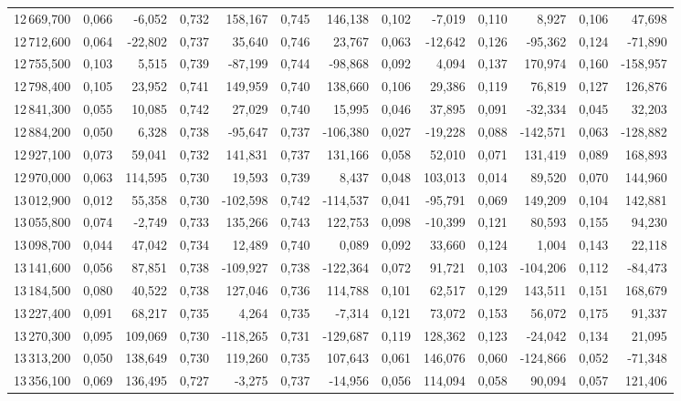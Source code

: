 \begin{longtable}{rrrrrrrrrrrrr}
12\,669,700 & 0,066 & -6,052 & 0,732 & 158,167 & 0,745 & 146,138 & 0,102 & -7,019 & 0,110 & 8,927 & 0,106 & 47,698\\
12\,712,600 & 0,064 & -22,802 & 0,737 & 35,640 & 0,746 & 23,767 & 0,063 & -12,642 & 0,126 & -95,362 & 0,124 & -71,890\\
12\,755,500 & 0,103 & 5,515 & 0,739 & -87,199 & 0,744 & -98,868 & 0,092 & 4,094 & 0,137 & 170,974 & 0,160 & -158,957\\
12\,798,400 & 0,105 & 23,952 & 0,741 & 149,959 & 0,740 & 138,660 & 0,106 & 29,386 & 0,119 & 76,819 & 0,127 & 126,876\\
12\,841,300 & 0,055 & 10,085 & 0,742 & 27,029 & 0,740 & 15,995 & 0,046 & 37,895 & 0,091 & -32,334 & 0,045 & 32,203\\
12\,884,200 & 0,050 & 6,328 & 0,738 & -95,647 & 0,737 & -106,380 & 0,027 & -19,228 & 0,088 & -142,571 & 0,063 & -128,882\\
12\,927,100 & 0,073 & 59,041 & 0,732 & 141,831 & 0,737 & 131,166 & 0,058 & 52,010 & 0,071 & 131,419 & 0,089 & 168,893\\
12\,970,000 & 0,063 & 114,595 & 0,730 & 19,593 & 0,739 & 8,437 & 0,048 & 103,013 & 0,014 & 89,520 & 0,070 & 144,960\\
13\,012,900 & 0,012 & 55,358 & 0,730 & -102,598 & 0,742 & -114,537 & 0,041 & -95,791 & 0,069 & 149,209 & 0,104 & 142,881\\
13\,055,800 & 0,074 & -2,749 & 0,733 & 135,266 & 0,743 & 122,753 & 0,098 & -10,399 & 0,121 & 80,593 & 0,155 & 94,230\\
13\,098,700 & 0,044 & 47,042 & 0,734 & 12,489 & 0,740 & 0,089 & 0,092 & 33,660 & 0,124 & 1,004 & 0,143 & 22,118\\
13\,141,600 & 0,056 & 87,851 & 0,738 & -109,927 & 0,738 & -122,364 & 0,072 & 91,721 & 0,103 & -104,206 & 0,112 & -84,473\\
13\,184,500 & 0,080 & 40,522 & 0,738 & 127,046 & 0,736 & 114,788 & 0,101 & 62,517 & 0,129 & 143,511 & 0,151 & 168,679\\
13\,227,400 & 0,091 & 68,217 & 0,735 & 4,264 & 0,735 & -7,314 & 0,121 & 73,072 & 0,153 & 56,072 & 0,175 & 91,337\\
13\,270,300 & 0,095 & 109,069 & 0,730 & -118,265 & 0,731 & -129,687 & 0,119 & 128,362 & 0,123 & -24,042 & 0,134 & 21,095\\
13\,313,200 & 0,050 & 138,649 & 0,730 & 119,260 & 0,735 & 107,643 & 0,061 & 146,076 & 0,060 & -124,866 & 0,052 & -71,348\\
13\,356,100 & 0,069 & 136,495 & 0,727 & -3,275 & 0,737 & -14,956 & 0,056 & 114,094 & 0,058 & 90,094 & 0,057 & 121,406\\

\end{longtable}
